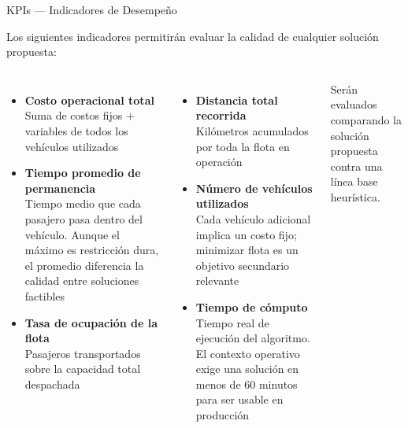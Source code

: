 \documentclass[10pt, aspectratio=169]{beamer}
\begin{document}
\begin{frame}{KPIs — Indicadores de Desempeño}

  \vspace{4pt}
  Los siguientes indicadores permitirán evaluar la calidad de cualquier solución propuesta:

  \vspace{10pt}
  \begin{columns}[T]
      \begin{itemize}\setlength\itemsep{10pt}
        \item \textbf{Costo operacional total}\\
          \footnotesize Suma de costos fijos + variables de todos los vehículos utilizados
        \item \textbf{Tiempo promedio de permanencia}\\
          \footnotesize Tiempo medio que cada pasajero pasa dentro del vehículo. Aunque el máximo es restricción dura, el promedio diferencia la calidad entre soluciones factibles
        \item \textbf{Tasa de ocupación de la flota}\\
          \footnotesize Pasajeros transportados sobre la capacidad total despachada
      \end{itemize}

      \begin{itemize}\setlength\itemsep{10pt}
        \item \textbf{Distancia total recorrida}\\
          \footnotesize Kilómetros acumulados por toda la flota en operación
        \item \textbf{Número de vehículos utilizados}\\
          \footnotesize Cada vehículo adicional implica un costo fijo; minimizar flota es un objetivo secundario relevante
        \item \textbf{Tiempo de cómputo}\\
          \footnotesize Tiempo real de ejecución del algoritmo. El contexto operativo exige una solución en menos de 60 minutos para ser usable en producción
      \end{itemize}

      \vspace{10pt}
      \begin{block}{}
        \footnotesize Serán evaluados comparando la solución propuesta contra una línea base heurística.
      \end{block}
  \end{columns}

\end{frame}
\end{document}
